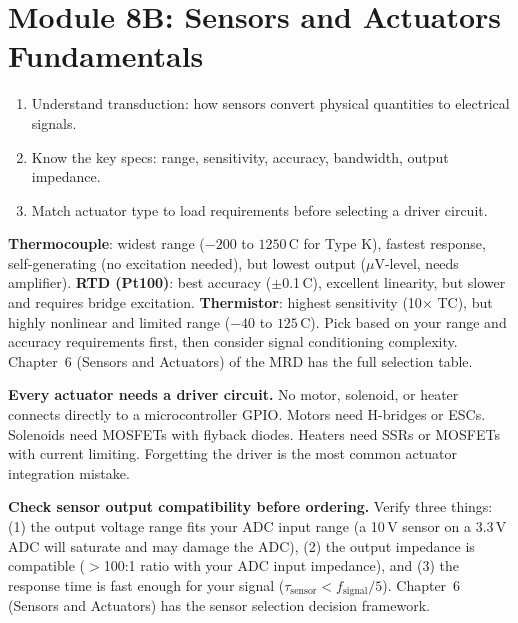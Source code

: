 \documentclass[11pt,letterpaper]{article}
\begin{document}
\section{Module 8B: Sensors and Actuators Fundamentals}

\begin{priorities}
\begin{enumerate}[leftmargin=*, itemsep=1pt, topsep=0pt]
    \item Understand transduction: how sensors convert physical quantities to electrical signals.
    \item Know the key specs: range, sensitivity, accuracy, bandwidth, output impedance.
    \item Match actuator type to load requirements before selecting a driver circuit.
\end{enumerate}
\end{priorities}

\begin{faqbox}
\textbf{Thermocouple}: widest range ($-200$ to $1250$\,\textdegree{}C for Type K), fastest response, self-generating (no excitation needed), but lowest output ($\mu$V-level, needs amplifier). \textbf{RTD (Pt100)}: best accuracy ($\pm$0.1\,\textdegree{}C), excellent linearity, but slower and requires bridge excitation. \textbf{Thermistor}: highest sensitivity (10$\times$ TC), but highly nonlinear and limited range ($-40$ to $125$\,\textdegree{}C). Pick based on your range and accuracy requirements first, then consider signal conditioning complexity. Chapter~6 (Sensors and Actuators) of the MRD has the full selection table.
\end{faqbox}

\begin{warnbox}
\textbf{Every actuator needs a driver circuit.} No motor, solenoid, or heater connects directly to a microcontroller GPIO. Motors need H-bridges or ESCs. Solenoids need MOSFETs with flyback diodes. Heaters need SSRs or MOSFETs with current limiting. Forgetting the driver is the most common actuator integration mistake.
\end{warnbox}

\begin{protip}
\textbf{Check sensor output compatibility before ordering.} Verify three things: (1) the output voltage range fits your ADC input range (a 10\,V sensor on a 3.3\,V ADC will saturate and may damage the ADC), (2) the output impedance is compatible ($>$100:1 ratio with your ADC input impedance), and (3) the response time is fast enough for your signal ($\tau_{\text{sensor}} < f_{\text{signal}}/5$). Chapter~6 (Sensors and Actuators) has the sensor selection decision framework.
\end{protip}
\end{document}
